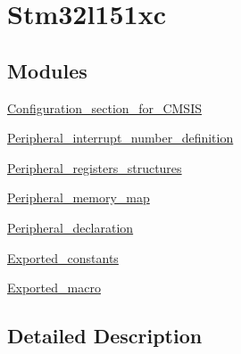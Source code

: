 \hypertarget{group__stm32l151xc}{\section{Stm32l151xc}
\label{group__stm32l151xc}
}
\subsection*{Modules}
\begin{DoxyCompactItemize}
\item 
\hyperlink{group___configuration__section__for___c_m_s_i_s}{Configuration\-\_\-section\-\_\-for\-\_\-\-C\-M\-S\-I\-S}
\item 
\hyperlink{group___peripheral__interrupt__number__definition}{Peripheral\-\_\-interrupt\-\_\-number\-\_\-definition}
\item 
\hyperlink{group___peripheral__registers__structures}{Peripheral\-\_\-registers\-\_\-structures}
\item 
\hyperlink{group___peripheral__memory__map}{Peripheral\-\_\-memory\-\_\-map}
\item 
\hyperlink{group___peripheral__declaration}{Peripheral\-\_\-declaration}
\item 
\hyperlink{group___exported__constants}{Exported\-\_\-constants}
\item 
\hyperlink{group___exported__macro}{Exported\-\_\-macro}
\end{DoxyCompactItemize}


\subsection{Detailed Description}
